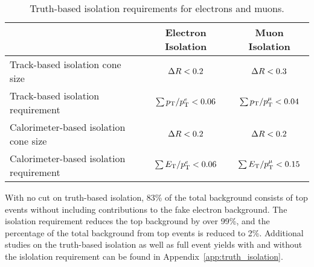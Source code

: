 \begin{table}[htp]
  \centering
  \begin{tabular}{l|c|c}
    ~       &   Electron Isolation & Muon Isolation \\
    \hline\hline
    Track-based isolation cone size   	    &   $\Delta R < 0.2$          & $\Delta R < 0.3$ \\
    Track-based isolation requirement       &   $\sum p_{\mathrm{T}}/p_{\mathrm{T}}^{e} <  0.06$ & $\sum p_{\mathrm{T}}/p_{\mathrm{T}}^{\mu} <  0.04$	\\
    Calorimeter-based isolation cone size   &   $\Delta R < 0.2$	         & $\Delta R < 0.2$\\
    Calorimeter-based isolation requirement &   $\sum E_{\mathrm{T}}/p_{\mathrm{T}}^{e} <  0.06$ & $\sum E_{\mathrm{T}}/p_{\mathrm{T}}^{\mu} <  0.15$	\\
    \hline
  \end{tabular}
  \caption{Truth-based isolation requirements for electrons and muons.} 
  \label{tab:truth_iso_definition}
\end{table}

With no cut on truth-based isolation, 83\% of the total background consists of top events without including contributions to the fake electron background.
The isolation requirement reduces the top background by over 99\%, and the percentage of the total background from top events is reduced to 2\%.
Additional studies on the truth-based isolation as well as full event yields with and without the islolation requirement can be found in Appendix~\ref{app:truth_isolation}.
